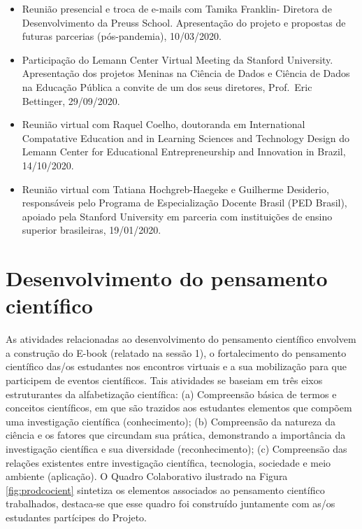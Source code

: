 \documentclass[
]{book}
\providecommand{\tightlist}{%
  \setlength{\itemsep}{0pt}\setlength{\parskip}{0pt}}
\begin{document}
\begin{itemize}
\tightlist
\item
  Reunião presencial e troca de e-mails com Tamika Franklin- Diretora de Desenvolvimento da Preuss School. Apresentação do projeto e propostas de futuras parcerias (pós-pandemia), 10/03/2020.
\item
  Participação do Lemann Center Virtual Meeting da Stanford University. Apresentação dos projetos Meninas na Ciência de Dados e Ciência de Dados na Educação Pública a convite de um dos seus diretores, Prof.~Eric Bettinger, 29/09/2020.
\item
  Reunião virtual com Raquel Coelho, doutoranda em International Compatative Education and in Learning Sciences and Technology Design do Lemann Center for Educational Entrepreneurship and Innovation in Brazil, 14/10/2020.
\item
  Reunião virtual com Tatiana Hochgreb-Haegeke e Guilherme Desiderio, responsáveis pelo Programa de Especialização Docente Brasil (PED Brasil), apoiado pela Stanford University em parceria com instituições de ensino superior brasileiras, 19/01/2020.
\end{itemize}

\hypertarget{prodconh}{%
\chapter{Desenvolvimento do pensamento científico}\label{prodconh}}

As atividades relacionadas ao desenvolvimento do pensamento científico envolvem a construção do E-book (relatado na sessão 1), o fortalecimento do pensamento científico das/os estudantes nos encontros virtuais e a sua mobilização para que participem de eventos científicos.
Tais atividades se baseiam em três eixos estruturantes da alfabetização científica: (a) Compreensão básica de termos e conceitos científicos, em que são trazidos aos estudantes elementos que compõem uma investigação científica (conhecimento); (b) Compreensão da natureza da ciência e os fatores que circundam sua prática, demonstrando a importância da investigação científica e sua diversidade (reconhecimento); (c) Compreensão das relações existentes entre investigação científica, tecnologia, sociedade e meio ambiente (aplicação).
O Quadro Colaborativo ilustrado na Figura \ref{fig:prodcocient} sintetiza os elementos associados ao pensamento científico trabalhados, destaca-se que esse quadro foi construído juntamente com as/os estudantes partícipes do Projeto.
\end{document}
